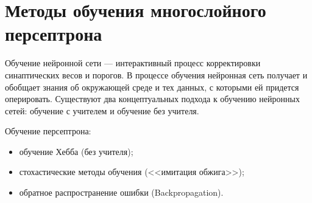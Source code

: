 \section{Методы обучения многослойного персептрона}

Обучение нейронной сети --- интерактивный процесс корректировки
синаптических весов и порогов. В процессе обучения нейронная сеть получает
и обобщает знания об окружающей среде и тех данных, с которыми ей
придется оперировать. Существуют два концептуальных подхода к обучению
нейронных сетей: обучение с учителем и обучение без учителя.

Обучение персептрона:
\begin{itemize}[label*=---]
	\item обучение Хебба (без учителя);
	\item стохастические методы обучения (<<имитация обжига>>);
	\item обратное распространение ошибки (Backpropagation).
\end{itemize}



\clearpage
